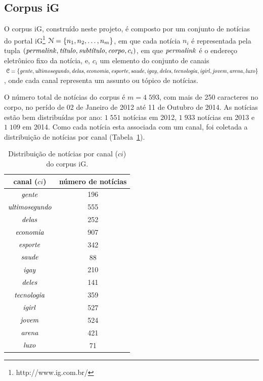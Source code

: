 \documentclass[normaltoc, espacoumemeio, pnumromarab,ruledheader]{abnt}
\begin{document}
\subsection{Corpus iG}
\label{subsec:corpusig}

O corpus iG, construído neste projeto, é composto por um conjunto de notícias do portal iG\footnote{http://www.ig.com.br/} ${\cal N} = \{ n_1, n_2, \dots, n_m \}$, em que cada notícia $n_i$ é representada pela tupla $(\text{\textit{permalink}}, \text{\textit{título}}, \text{\textit{subtítulo}}, \text{\textit{corpo}}, c_i)$, em que $\text{\textit{permalink}}$ é o endereço eletrônico fixo da notícia, e, $c_i$ um elemento do conjunto de canais $\;{\cal C} = \{ \text{\textit{gente}}, \text{\textit{ultimosegundo}}, \text{\textit{delas}}, \text{\textit{economia}},\\ \text{\textit{esporte}}, \text{\textit{saude}}, \text{\textit{igay}}, \text{\textit{deles}}, \text{\textit{tecnologia}}, \text{\textit{igirl}}, \text{\textit{jovem}}, \text{\textit{arena}}, \text{\textit{luxo}} \}$, onde cada canal representa um assunto ou tópico de notícias.

O número total de notícias do corpus é $m = 4\;593$, com mais de 250 caracteres no corpo, no perído de 02 de Janeiro de 2012 até 11 de Outubro de 2014. As notícias estão bem distribuídas por ano: $1\;551$ notícias em 2012, $1\;933$ notícias em 2013 e $1\;109$ em 2014. Como cada notícia esta associada com um canal, foi coletada a distribuição de notícias por canal (Tabela~\ref{tab:distcanais}).

\begin{table}[h]
\centering
\label{tab:distcanais}
\caption{Distribuição de notícias por canal ($ci$) do corpus iG.}
\begin{tabular}{c|c}
\hline
canal ($ci$)                    & número de notícias \\
\hline
$\text{\textit{gente}}$         & 196 \\
$\text{\textit{ultimosegundo}}$ & 555 \\
$\text{\textit{delas}}$         & 252 \\
$\text{\textit{economia}}$      & 907 \\
$\text{\textit{esporte}}$       & 342 \\
$\text{\textit{saude}}$         & 88  \\
$\text{\textit{igay}}$          & 210 \\
$\text{\textit{deles}}$         & 141 \\
$\text{\textit{tecnologia}}$    & 359 \\
$\text{\textit{igirl}}$         & 527 \\
$\text{\textit{jovem}}$         & 524 \\
$\text{\textit{arena}}$         & 421 \\
$\text{\textit{luxo}}$          & 71  \\
\hline
\end{tabular}
\end{table}
\end{document}
